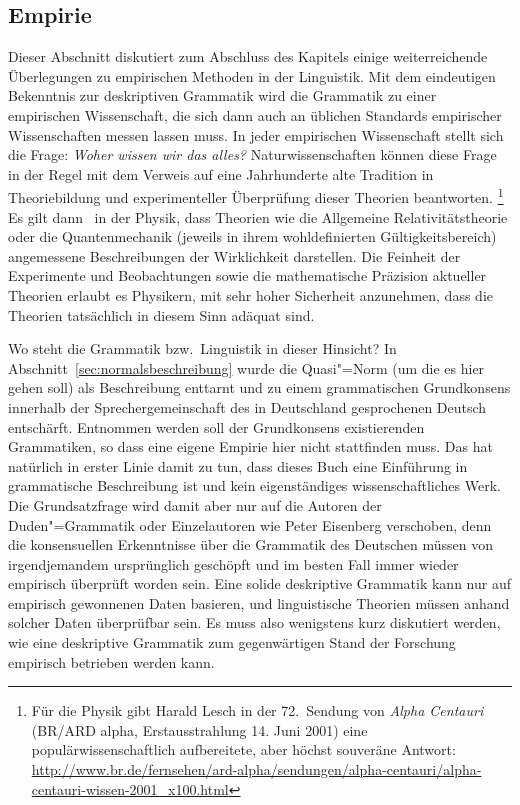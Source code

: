 \subsection{Empirie}
\label{sec:deskriptivtheoretisch}


Dieser Abschnitt diskutiert zum Abschluss des Kapitels einige weiterreichende Überlegungen zu empirischen Methoden in der Linguistik.
Mit dem eindeutigen Bekenntnis zur deskriptiven Grammatik wird die Grammatik zu einer empirischen Wissenschaft, die sich dann auch an üblichen Standards empirischer Wissenschaften messen lassen muss.     
In jeder empirischen Wissenschaft stellt sich die Frage:
\textit{Woher wissen wir das alles?}
Naturwissenschaften können diese Frage in der Regel mit dem Verweis auf eine Jahrhunderte alte Tradition in Theoriebildung und experimenteller Überprüfung dieser Theorien beantworten.%
\footnote{Für die Physik gibt Harald Lesch in der 72.\ Sendung von \textit{Alpha Centauri} (BR\slash ARD alpha, Erstausstrahlung 14. Juni 2001) eine populärwissenschaftlich aufbereitete, aber höchst souveräne Antwort: \url{http://www.br.de/fernsehen/ard-alpha/sendungen/alpha-centauri/alpha-centauri-wissen-2001_x100.html}}
Es gilt dann \zB\ in der Physik, dass Theorien wie die Allgemeine Relativitätstheorie oder die Quantenmechanik (jeweils in ihrem wohldefinierten Gültigkeitsbereich) angemessene Beschreibungen der Wirklichkeit darstellen.
Die Feinheit der Experimente und Beobachtungen sowie die mathematische Präzision aktueller Theorien erlaubt es Physikern, mit sehr hoher Sicherheit anzunehmen, dass die Theorien tatsächlich in diesem Sinn adäquat sind.

Wo steht die Grammatik bzw.\ Linguistik in dieser Hinsicht?
In Abschnitt~\ref{sec:normalsbeschreibung} wurde die Quasi"=Norm (um die es hier gehen soll) als Beschreibung enttarnt und zu einem grammatischen Grundkonsens innerhalb der Sprechergemeinschaft des in Deutschland gesprochenen Deutsch entschärft.
Entnommen werden soll der Grundkonsens existierenden Grammatiken, so dass eine eigene Empirie hier nicht stattfinden muss.
Das hat natürlich in erster Linie damit zu tun, dass dieses Buch eine Einführung in grammatische Beschreibung ist und kein eigenständiges wissenschaftliches Werk.
Die Grundsatzfrage wird damit aber nur auf die Autoren der Duden"=Grammatik oder Einzelautoren wie Peter Eisenberg verschoben, denn die konsensuellen Erkenntnisse über die Grammatik des Deutschen müssen von irgendjemandem ursprünglich geschöpft und im besten Fall immer wieder empirisch überprüft worden sein.
Eine solide deskriptive Grammatik kann nur auf empirisch gewonnenen Daten basieren, und linguistische Theorien müssen anhand solcher Daten überprüfbar sein.
Es muss also wenigstens kurz diskutiert werden, wie eine deskriptive Grammatik zum gegenwärtigen Stand der Forschung empirisch betrieben werden kann.

